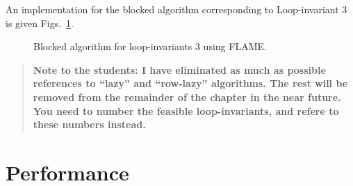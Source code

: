 An implementation for the blocked algorithm corresponding to
Loop-invariant 3 is given Figs.~\ref{fig:trmm_lln_right}.

\begin{figure}[htbp]
\begin{quote}
%
\end{quote}
\caption{Blocked algorithm for loop-invariants 3 using FLAME.}
\label{fig:trmm_lln_right}
\end{figure}

\begin{quote}
\bf Note to the students: I have eliminated as much
as possible references to ``lazy'' and ``row-lazy'' algorithms.  The
rest will be removed from the remainder of the chapter in the near
future.  You need to number the feasible loop-invariants, and refere
to these numbers instead.
\end{quote}

\section{Performance}

